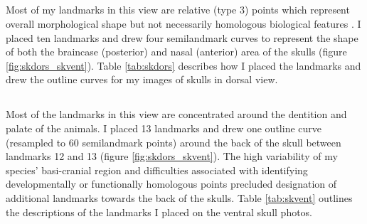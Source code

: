 \subsection{}
	Most of my landmarks in this view are relative (type 3) points which represent overall morphological shape but not necessarily homologous biological features \citep{Zelditch2012}. I placed ten landmarks and drew four semilandmark curves to represent the shape of both the braincase (posterior) and nasal (anterior) area of the skulls (figure \ref{fig:skdors_skvent}). Table \ref{tab:skdors} describes how I placed the landmarks and drew the outline curves for my images of skulls in dorsal view.

\subsection{}

	Most of the landmarks in this view are concentrated around the dentition and palate of the animals. I placed 13 landmarks and drew one outline curve (resampled to 60 semilandmark points) around the back of the skull between landmarks 12 and 13 (figure \ref{fig:skdors_skvent}). The high variability of my species' basi-cranial region and difficulties associated with identifying developmentally or functionally homologous points precluded designation of additional landmarks towards the back of the skulls. Table \ref{tab:skvent} outlines the descriptions of the landmarks I placed on the ventral skull photos.


